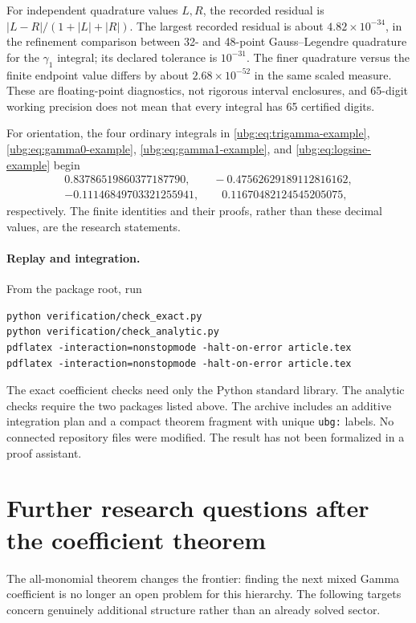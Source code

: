 \documentclass[11pt,letterpaper]{article}
\numberwithin{equation}{section}
\theoremstyle{definition}\newtheorem{definition}[theorem]{Definition}
\theoremstyle{remark}\newtheorem{remark}[theorem]{Remark}
\newcommand{\src}[1]{\nolinkurl{#1}}
\begin{document}
For independent quadrature values $L,R$, the recorded residual is
$|L-R|/(1+|L|+|R|)$. The largest recorded residual is about
$4.82\times10^{-34}$, in the refinement comparison between 32- and
48-point Gauss--Legendre quadrature for the $\gamma_1$ integral; its
declared tolerance is $10^{-31}$. The finer quadrature versus the
finite endpoint value differs by about $2.68\times10^{-52}$ in the
same scaled measure. These are floating-point diagnostics, not rigorous
interval enclosures, and 65-digit working precision does not mean that
every integral has 65 certified digits.

For orientation, the four ordinary integrals in
\eqref{ubg:eq:trigamma-example}, \eqref{ubg:eq:gamma0-example},
\eqref{ubg:eq:gamma1-example}, and \eqref{ubg:eq:logsine-example} begin
\[
 \begin{gathered}
 0.83786519860377187790,\qquad -0.47562629189112816162,\\
 -0.11146849703321255941,\qquad 0.11670482124545205075,
 \end{gathered}
\]
respectively. The finite identities and their proofs, rather than these
decimal values, are the research statements.

\paragraph{Replay and integration.}
From the package root, run
\begin{verbatim}
python verification/check_exact.py
python verification/check_analytic.py
pdflatex -interaction=nonstopmode -halt-on-error article.tex
pdflatex -interaction=nonstopmode -halt-on-error article.tex
\end{verbatim}
The exact coefficient checks need only the Python standard library.
The analytic checks require the two packages listed above.
The archive includes an additive integration plan and a compact theorem
fragment with unique \src{ubg:} labels. No connected repository files
were modified. The result has not been formalized in a proof assistant.

\section{Further research questions after the coefficient theorem}
\label{ubg:sec:questions}

The all-monomial theorem changes the frontier: finding the next mixed
Gamma coefficient is no longer an open problem for this hierarchy.
The following targets concern genuinely additional structure rather
than an already solved sector.
\end{document}
